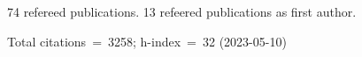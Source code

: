 74 refereed publications. 13 refeered publications as first author.

Total citations~=~3258; h-index~=~32 (2023-05-10)